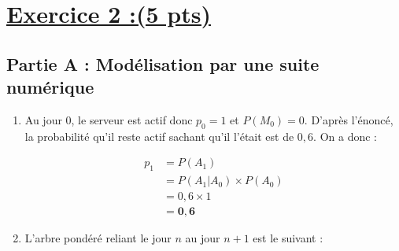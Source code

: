 \documentclass[12pt,a4paper]{article}
\begin{document}
\section*{\underline{Exercice 2 :(5 pts)} }

\subsection*{Partie A : Modélisation par une suite numérique}

\begin{enumerate}
    \item Au jour 0, le serveur est actif donc $p_0 = 1$ et $P(M_0) = 0$. D'après l'énoncé, la probabilité qu'il reste actif sachant qu'il l'était est de $0,6$. On a donc :
    
    \begin{align*}
    p_1 &= P(A_1) \\
        &= P(A_1 | A_0) \times P(A_0) \\
        &= 0,6 \times 1 \\
        &= \mathbf{0,6}
    \end{align*}

    \item L'arbre pondéré reliant le jour $n$ au jour $n+1$ est le suivant :

\end{enumerate}
\end{document}
